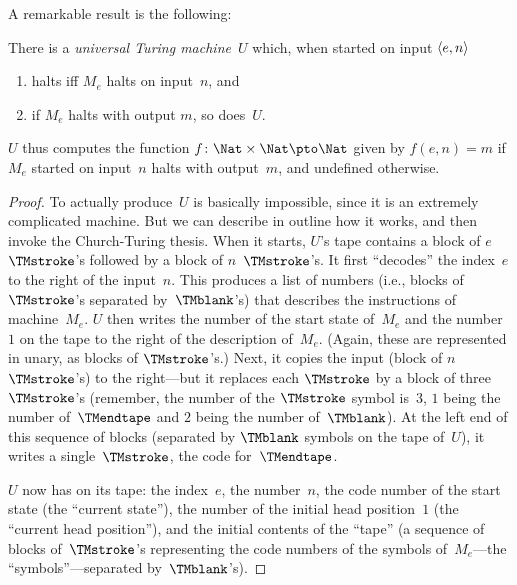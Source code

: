 \documentclass[../../../include/open-logic-section]{subfiles}
\begin{document}
A remarkable result is the following:

\begin{thm} There is a \emph{universal
  Turing machine}~$U$ which, when started on input $\langle e,n \rangle$ 
  \begin{enumerate}
    \item halts iff $M_e$ halts on input~$n$, and
    \item if $M_e$ halts with output $m$, so does~$U$.
  \end{enumerate}
  $U$ thus computes the function $f\colon \Nat \times \Nat \pto \Nat$
  given by $f(e,n) = m$ if $M_e$ started on input~$n$ halts with
  output~$m$, and undefined otherwise.
\end{thm}

\begin{proof}
  To actually produce~$U$ is basically impossible, since it is an
  extremely complicated machine. But we can describe in outline how it
  works, and then invoke the Church-Turing thesis.  When it starts,
  $U$'s tape contains a block of $e$ $\TMstroke$'s followed by a block
  of $n$~$\TMstroke$'s. It first ``decodes'' the index~$e$ to the
  right of the input~$n$. This produces a list of numbers (i.e.,
  blocks of $\TMstroke$'s separated by~$\TMblank$'s) that describes
  the instructions of machine~$M_e$. $U$ then writes the number of the
  start state of~$M_e$ and the number~$1$ on the tape to the right of
  the description of~$M_e$. (Again, these are represented in unary, as
  blocks of $\TMstroke$'s.) Next, it copies the input (block of
  $n$~$\TMstroke$'s) to the right---but it replaces each $\TMstroke$
  by a block of three $\TMstroke$'s (remember, the number of the $\TMstroke$
  symbol is~$3$, $1$ being the number of~$\TMendtape$ and $2$ being
  the number of~$\TMblank$). At the left end of this sequence of blocks
  (separated by $\TMblank$ symbols on the tape of~$U$), it writes a
  single~$\TMstroke$, the code for~$\TMendtape$.

  $U$ now has on its tape: the index~$e$, the number~$n$, the code
  number of the start state (the ``current state''), the number of the
  initial head position~$1$ (the ``current head position''), and the
  initial contents of the ``tape'' (a sequence of blocks
  of~$\TMstroke$'s representing the code numbers of the symbols
  of~$M_e$---the ``symbols''---separated by~$\TMblank$'s).


\end{proof}
\end{document}
